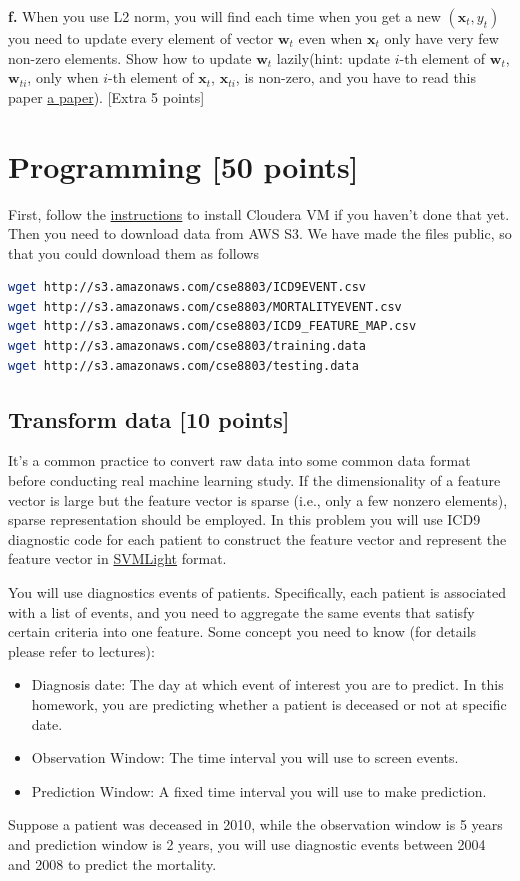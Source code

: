 \documentclass[12pt]{article}
\begin{document}
\textbf{f.} When you use L2 norm, you will find each time when you get a new $(\mathbf{x}_t, y_t)$ you need to update every element of vector $\mathbf{w}_t$ even when $\mathbf{x}_t$ only have very few non-zero elements. Show how to update $\mathbf{w}_t$ lazily(hint: update $i$-th element of $\mathbf{w}_{t}$, $\mathbf{w}_{ti}$, only when $i$-th element of $\mathbf{x}_{t}$, $\mathbf{x}_{ti}$, is non-zero, and you have to read this paper \href{http://lingpipe.files.wordpress.com/2008/04/lazysgdregression.pdf}{a paper}). [Extra 5 points]

\newpage
\section{Programming [50 points]}
First, follow the \href{https://sites.google.com/site/classbdh/quick-vm.pdf?attredirects=0}{instructions} to install Cloudera VM if you haven't done that yet. Then you need to download data from AWS S3. We have made the files public, so that you could download them as follows
\begin{lstlisting}[frame=single, language=bash]
wget http://s3.amazonaws.com/cse8803/ICD9EVENT.csv
wget http://s3.amazonaws.com/cse8803/MORTALITYEVENT.csv
wget http://s3.amazonaws.com/cse8803/ICD9_FEATURE_MAP.csv
wget http://s3.amazonaws.com/cse8803/training.data
wget http://s3.amazonaws.com/cse8803/testing.data
\end{lstlisting}

\subsection{Transform data [10 points]}
It's a common practice to convert raw data into some common data format before conducting real machine learning study. If the dimensionality of a feature vector is large but the feature vector is sparse (i.e., only a few nonzero elements), sparse representation should be employed. In this problem you will use ICD9 diagnostic code for each patient to construct the feature vector and represent the feature vector in \href{http://svmlight.joachims.org/}{SVMLight} format. 

You will use diagnostics events of patients. Specifically, each patient is associated with a list of events, and you need to aggregate the same events that satisfy certain criteria into one feature. Some concept you need to know (for details please refer to lectures):
\begin{itemize}
\item Diagnosis date: The day at which event of interest you are to predict. In this homework, you are predicting whether a patient is deceased or not at specific date.
\item Observation Window: The time interval you will use to screen events.
\item Prediction Window: A fixed time interval you will use to make prediction.
\end{itemize}
Suppose a patient was deceased in 2010, while the observation window is 5 years and prediction window is 2 years, you will use diagnostic events between 2004 and 2008 to predict the mortality. 
\end{document}
